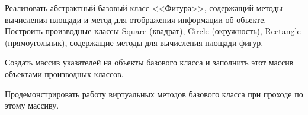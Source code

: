 Реализовать абстрактный базовый класс <<Фигура>>,
содержащий методы вычисления площади и метод 
для отображения информации об объекте. Построить
производные классы Square (квадрат), Circle (окружность),
Rectangle (прямоугольник), содержащие методы для
вычисления площади фигур.

Создать массив указателей на
объекты базового класса и заполнить этот массив объектами
производных классов.

Продемонстрировать работу
виртуальных методов базового класса при проходе по этому
массиву.
